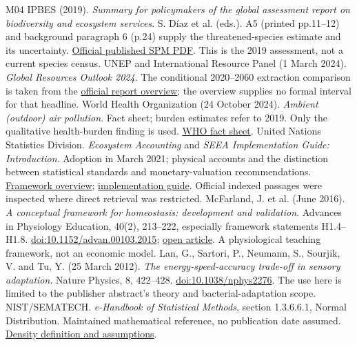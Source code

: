 \begin{thebibliography}{M04}
 IPBES (2019). \textit{Summary for policymakers of the global assessment report on biodiversity and ecosystem services}. S. D\'iaz et al. (eds.). A5 (printed pp.11--12) and background paragraph 6 (p.24) supply the threatened-species estimate and its uncertainty. \href{https://files.ipbes.net/ipbes-web-prod-public-files/2020-02/ipbes_global_assessment_report_summary_for_policymakers_en.pdf}{Official published SPM PDF}. This is the 2019 assessment, not a current species census.
 UNEP and International Resource Panel (1 March 2024). \textit{Global Resources Outlook 2024}. The conditional 2020--2060 extraction comparison is taken from the \href{https://www.unep.org/resources/Global-Resource-Outlook-2024}{official report overview}; the overview supplies no formal interval for that headline.
 World Health Organization (24 October 2024). \textit{Ambient (outdoor) air pollution}. Fact sheet; burden estimates refer to 2019. Only the qualitative health-burden finding is used. \href{https://www.who.int/news-room/fact-sheets/detail/ambient-(outdoor)-air-quality-and-health}{WHO fact sheet}.
 United Nations Statistics Division. \textit{Ecosystem Accounting} and \textit{SEEA Implementation Guide: Introduction}. Adoption in March 2021; physical accounts and the distinction between statistical standards and monetary-valuation recommendations. \href{https://seea.un.org/en/methodology/ecosystem-accounting}{Framework overview}; \href{https://seea.un.org/en/content/seea-implementation-guide-introduction}{implementation guide}. Official indexed passages were inspected where direct retrieval was restricted.
 McFarland, J. et al. (June 2016). \textit{A conceptual framework for homeostasis: development and validation}. Advances in Physiology Education, 40(2), 213--222, especially framework statements H1.4--H1.8. \href{https://doi.org/10.1152/advan.00103.2015}{doi:10.1152/advan.00103.2015}; \href{https://pmc.ncbi.nlm.nih.gov/articles/PMC5002438/}{open article}. A physiological teaching framework, not an economic model.
 Lan, G., Sartori, P., Neumann, S., Sourjik, V. and Tu, Y. (25 March 2012). \textit{The energy-speed-accuracy trade-off in sensory adaptation}. Nature Physics, 8, 422--428. \href{https://doi.org/10.1038/nphys2276}{doi:10.1038/nphys2276}. The use here is limited to the publisher abstract's theory and bacterial-adaptation scope.
 NIST/SEMATECH. \textit{e-Handbook of Statistical Methods}, section 1.3.6.6.1, Normal Distribution. Maintained mathematical reference, no publication date assumed. \href{https://www.itl.nist.gov/div898/handbook/eda/section3/eda3661.htm}{Density definition and assumptions}.

\end{thebibliography}
